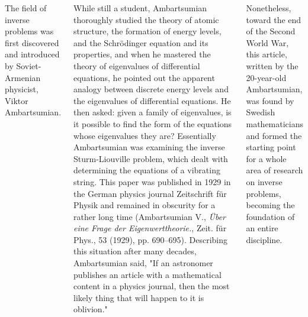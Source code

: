 \documentclass[a0paper,25pt]{tikzposter} %
\begin{document}
\begin{columns}
{The field of inverse problems was first discovered and introduced by Soviet-Armenian physicist, Viktor Ambartsumian.

While still a student, Ambartsumian thoroughly studied the theory of atomic structure, the formation of energy levels, and the Schr\"odinger equation and its properties, and when he mastered the theory of eigenvalues of differential equations, he pointed out the apparent analogy between discrete energy levels and the eigenvalues of differential equations. He then asked: given a family of eigenvalues, is it possible to find the form of the equations whose eigenvalues they are? Essentially Ambartsumian was examining the inverse Sturm-Liouville problem, which dealt with determining the equations of a vibrating string. This paper was published in 1929 in the German physics journal Zeitschrift f\"ur Physik and remained in obscurity for a rather long time (Ambartsumian V., {\it\"Uber eine Frage der Eigenwerttheorie.}, Zeit. f\"ur Phys., 53 (1929), pp. 690--695). Describing this situation after many decades, Ambartsumian said, "If an astronomer publishes an article with a mathematical content in a physics journal, then the most likely thing that will happen to it is oblivion."

Nonetheless, toward the end of the Second World War, this article, written by the 20-year-old Ambartsumian, was found by Swedish mathematicians and formed the starting point for a whole area of research on inverse problems, becoming the foundation of an entire discipline.
}


\end{columns}
\end{document}
